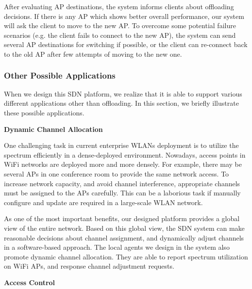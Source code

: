 \documentclass[english]{tktltiki}
\begin{document}
After evaluating AP destinations, the system informs clients about offloading decisions. If there is any AP which shows better overall performance, our system will ask the client to move to the new AP. To overcome some potential failure scenarios (e.g. the client fails to connect to the new AP), the system can send several AP destinations for switching if possible, or the client can re-connect back to the old AP after few attempts of moving to the new one.



\subsubsection{Other Possible Applications}

When we design this SDN platform, we realize that it is able to support various different applications other than offloading. In this section, we briefly illustrate these possible applications.


\vspace{1mm}

\textbf{Dynamic Channel Allocation}

\vspace{1mm}


One challenging task in current enterprise WLANs deployment is to utilize the spectrum efficiently in a dense-deployed environment. Nowadays, access points in WiFi networks are deployed more and more densely. For example, there may be several APs in one conference room to provide the same network access. To increase network capacity, and avoid channel interference, appropriate channels must be assigned to the APs carefully. This can be a laborious task if manually configure and update are required in a large-scale WLAN network.

As one of the most important benefits, our designed platform provides a global view of the entire network. Based on this global view, the SDN system can make reasonable decisions about channel assignment, and dynamically adjust channels in a software-based approach. The local agents we design in the system also promote dynamic channel allocation. They are able to report spectrum utilization on WiFi APs, and response channel adjustment requests.


\vspace{1mm}

\textbf{Access Control}

\vspace{1mm}
\end{document}
